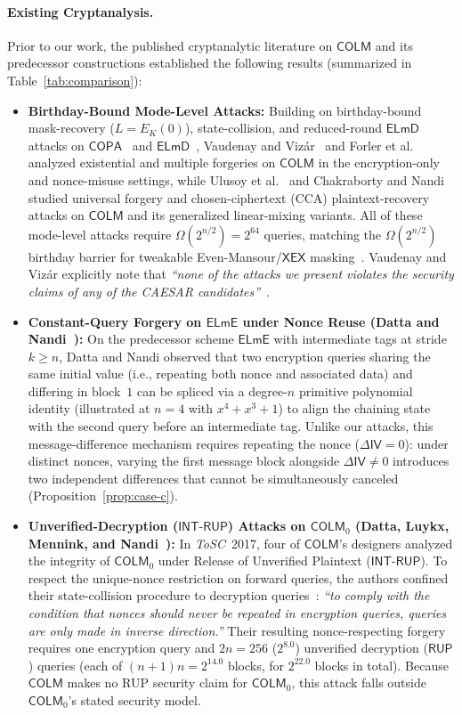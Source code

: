 \documentclass[11pt,a4paper]{article}
\theoremstyle{definition}
\theoremstyle{remark}
\newcommand{\COLM}{\mathsf{COLM}}
\newcommand{\COLMzero}{\mathsf{COLM}_0}
\newcommand{\COPA}{\mathsf{COPA}}
\newcommand{\ELmE}{\mathsf{ELmE}}
\newcommand{\ELmD}{\mathsf{ELmD}}
\newcommand{\IV}{\mathsf{IV}}
\begin{document}
\paragraph{Existing Cryptanalysis.}
Prior to our work, the published cryptanalytic literature on $\COLM$ and its predecessor constructions established the following results (summarized in Table~\ref{tab:comparison}):
\begin{itemize}[leftmargin=2em]
    \item \textbf{Birthday-Bound Mode-Level Attacks:} Building on birthday-bound mask-recovery ($L = E_K(0)$), state-collision, and reduced-round $\ELmD$ attacks on $\COPA$~\cite{Lu15} and $\ELmD$~\cite{BEK16}, Vaudenay and Viz\'{a}r~\cite[Section~18]{VV17} and Forler et al.~\cite{FLLW17} analyzed existential and multiple forgeries on $\COLM$ in the encryption-only and nonce-misuse settings, while Ulusoy et al.~\cite{UKE22} and Chakraborty and Nandi~\cite{CN24} studied universal forgery and chosen-ciphertext (CCA) plaintext-recovery attacks on $\COLM$ and its generalized linear-mixing variants. All of these mode-level attacks require $\Omega(2^{n/2}) = 2^{64}$ queries, matching the $\Omega(2^{n/2})$ birthday barrier for tweakable Even-Mansour/$\mathsf{XEX}$ masking~\cite{Mennink16}. Vaudenay and Viz\'{a}r explicitly note that \emph{``none of the attacks we present violates the security claims of any of the CAESAR candidates''}~\cite{VV17}.
    \item \textbf{Constant-Query Forgery on $\ELmE$ under Nonce Reuse (Datta and Nandi~\cite[Section~5.2]{DN14}):} On the predecessor scheme $\ELmE$ with intermediate tags at stride $k \ge n$, Datta and Nandi observed that two encryption queries sharing the same initial value (i.e., repeating both nonce and associated data) and differing in block~$1$ can be spliced via a degree-$n$ primitive polynomial identity (illustrated at $n = 4$ with $x^4 + x^3 + 1$) to align the chaining state with the second query before an intermediate tag. Unlike our attacks, this message-difference mechanism requires repeating the nonce ($\Delta\IV = 0$): under distinct nonces, varying the first message block alongside $\Delta\IV \neq 0$ introduces two independent differences that cannot be simultaneously canceled (Proposition~\ref{prop:case-c}).
    \item \textbf{Unverified-Decryption ($\mathsf{INT\text{-}RUP}$) Attacks on $\COLMzero$ (Datta, Luykx, Mennink, and Nandi~\cite{DLMN17}):} In \emph{ToSC}~2017, four of $\COLM$'s designers analyzed the integrity of $\COLMzero$ under Release of Unverified Plaintext ($\mathsf{INT\text{-}RUP}$). To respect the unique-nonce restriction on forward queries, the authors confined their state-collision procedure to decryption queries~\cite[Section~6, p.~152]{DLMN17}: \emph{``to comply with the condition that nonces should never be repeated in encryption queries, queries are only made in inverse direction.''} Their resulting nonce-respecting forgery requires one encryption query and $2n = 256$ ($2^{8.0}$) unverified decryption ($\mathsf{RUP}$) queries (each of $(n+1)n = 2^{14.0}$ blocks, for $2^{22.0}$ blocks in total). Because $\COLM$ makes no RUP security claim for $\COLMzero$, this attack falls outside $\COLMzero$'s stated security model.

\end{itemize}
\end{document}
